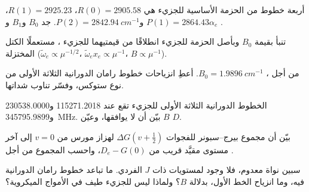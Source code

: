 \begin{exercise}[$\star\star$]\label{exo:b3:rovibrational-spectroscopy:7}
أربعة خطوط من الحزمة الأساسية للجزيء  هي $R(0) = 2905.58$، $R(1) = 2925.23$،
$P(1) = 2864.43$ و$P(2) = \qty{2842.94}{cm^{-1}}$. جد $B_0$ و$B_1$ و$\alpha_e$ 
.
\end{exercise}

\begin{exercise}[$\star\star$]\label{exo:b3:rovibrational-spectroscopy:8}
تنبأ بقيمة $B_0$ وبأصل الحزمة للجزيء  انطلاقًا من قيمتيهما للجزيء ، مستعملًا
الكتل المختزلة ($\tilde\omega_e \propto \mu^{-1/2}$، $\tilde\omega_ex_e \propto
\mu^{-1}$، $B \propto \mu^{-1}$).
\end{exercise}

\begin{exercise}[$\star\star$]\label{exo:b3:rovibrational-spectroscopy:9}
من أجل ، $B_0 = \qty{1.9896}{cm^{-1}}$. أعطِ انزياحات خطوط رامان الدورانية
الثلاثة الأولى من نوع ستوكس، وفسّر تناوب
شداتها.
\end{exercise}

\begin{exercise}[$\star\star\star$]\label{exo:b3:rovibrational-spectroscopy:10}
الخطوط الدورانية الثلاثة الأولى للجزيء  تقع عند 115271.2018 
و230538.0000 و\qty{345795.9899}{MHz}. بيّن أن  لا يوافقها،
وعيّن $B$  $D$.
\end{exercise}

\begin{exercise}[$\star\star\star$]\label{exo:b3:rovibrational-spectroscopy:11}
بيّن أن مجموع بيرج--سبونر للفجوات $\Delta G(v + \frac12)$ لهزاز مورس
من $v = 0$ إلى آخر مستوى مقيَّد قريب من $D_e - G(0)$، 
واحسب المجموع من أجل .
\end{exercise}

\begin{exercise}[$\star\star\star$]\label{exo:b3:rovibrational-spectroscopy:12}
سبين نواة  معدوم، فلا وجود لمستويات  ذات
$J$ الفردي. ما تباعد خطوط رامان الدورانية فيه، وما
انزياح الخط الأول، بدلالة $B$؟ ولماذا ليس للجزيء  طيف في
الأمواج الميكروية؟
\end{exercise}

